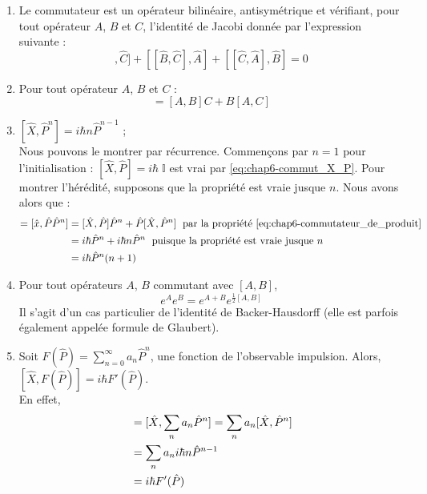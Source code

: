\documentclass[../notesdecours]{subfiles}
\begin{document}
\begin{enumerate}
    \item Le commutateur est un opérateur bilinéaire, antisymétrique et vérifiant, pour tout opérateur $A$, $B$ et $C$, l'identité de Jacobi donnée par l'expression suivante :
	\begin{equation}
		[[\hat{A},\hat{B}],\hat{C}] + [[\hat{B},\hat{C}],\hat{A}] + [[\hat{C},\hat{A}],\hat{B}] = 0
	\end{equation}
    \item Pour tout opérateur $A$, $B$ et $C$ : 
    \begin{equation}
        [A,BC] = [A,B]C + B[A,C]
        \label{eq:chap6-commutateur_de_produit}
    \end{equation}
    \item $[\hat{X}, \hat{P}^n] = i\hbar n\hat{P}^{n-1}$ ; \\
	    Nous pouvons le montrer par récurrence. Commençons par $n=1$ pour l'initialisation : $[\hat{X}, \hat{P}] = i\hbar \; \mathbb{I}$ est vrai par \eqref{eq:chap6-commut_X_P}. Pour montrer l'hérédité, supposons que la propriété est vraie jusque $n$. Nous avons alors que :
    \begin{align} [\hat{X}, \hat{P}^{n+1}] = [\hat{x}, \hat{P}\hat{P}^n] &= [\hat{X}, \hat{P}]\hat{P}^n + \hat{P}[\hat{X}, \hat{P}^n] \; \mbox{ par la propriété \eqref{eq:chap6-commutateur_de_produit}} \notag \\
        &= i\hbar \hat{P}^n + i\hbar n \hat{P}^n \; \mbox{ puisque la propriété est vraie jusque $n$} \notag \\
        &= i\hbar \hat{P}^n (n+1)
    \end{align}
    \item Pour tout opérateurs $A$, $B$ commutant avec $[A,B]$, 
    	\begin{equation}
            e^A e^B = e^{A+B}e^{\frac{1}{2} [A,B]}
    	\end{equation}
    Il s'agit d'un cas particulier de l'identité de Backer-Hausdorff (elle est parfois également appelée formule de Glaubert).
    \item Soit $F(\hat{P}) = \sum_{n=0}^\infty a_n \hat{P}^n$, une fonction de l'observable impulsion. Alors, $[\hat{X}, F(\hat{P})] = i\hbar F'(\hat{P})$. \\
    En effet, \begin{align}
        [\hat{X}, F(\hat{P})] &= [\hat{X}, \sum_n a_n \hat{P}^n] = \sum_n a_n[\hat{X}, \hat{P}^n] \notag \\
        &= \sum_n a_n i\hbar n \hat{P}^{n-1} \notag \\
        &= i\hbar F'(\hat{P}) \label{commutateur d'une fonction de P}
    \end{align}
\end{enumerate}
\end{document}
